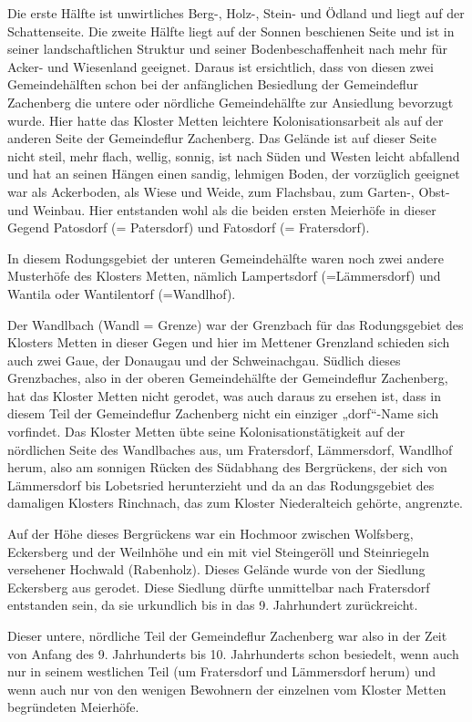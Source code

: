 \documentclass[12pt,a4pager]{book}
\begin{document}
Die erste Hälfte ist unwirtliches Berg-, Holz-, Stein- und Ödland und liegt auf
der Schattenseite. Die zweite Hälfte liegt auf der Sonnen beschienen Seite und
ist in seiner landschaftlichen Struktur und seiner Bodenbeschaffenheit nach mehr
für Acker- und Wiesenland geeignet. Daraus ist ersichtlich, dass von diesen zwei
Gemeindehälften schon bei der anfänglichen Besiedlung der Gemeindeflur
Zachenberg die untere oder nördliche Gemeindehälfte zur Ansiedlung bevorzugt
wurde. Hier hatte das Kloster Metten leichtere Kolonisationsarbeit als auf der
anderen Seite der Gemeindeflur Zachenberg. Das Gelände ist auf dieser Seite
nicht steil, mehr flach, wellig, sonnig, ist nach Süden und Westen leicht
abfallend und hat an seinen Hängen einen sandig, lehmigen Boden, der vorzüglich
geeignet war als Ackerboden, als Wiese und Weide, zum Flachsbau, zum Garten-,
Obst- und Weinbau. Hier entstanden wohl als die beiden ersten Meierhöfe in
dieser Gegend Patosdorf (= Patersdorf) und Fatosdorf (= Fratersdorf).

In diesem Rodungsgebiet der unteren Gemeindehälfte waren noch zwei andere
Musterhöfe des Klosters Metten, nämlich Lampertsdorf (=Lämmersdorf) und Wantila
oder Wantilentorf (=Wandlhof).

Der Wandlbach (Wandl = Grenze) war der Grenzbach für das Rodungsgebiet des
Klosters Metten in dieser Gegen und hier im Mettener Grenzland schieden sich
auch zwei Gaue, der Donaugau und der Schweinachgau. Südlich dieses Grenzbaches,
also in der oberen Gemeindehälfte der Gemeindeflur Zachenberg, hat das Kloster
Metten nicht gerodet, was auch daraus zu ersehen ist, dass in diesem Teil der
Gemeindeflur Zachenberg nicht ein einziger „dorf“-Name sich vorfindet. Das
Kloster Metten übte seine Kolonisationstätigkeit auf der nördlichen Seite des
Wandlbaches aus, um Fratersdorf, Lämmersdorf, Wandlhof herum, also am sonnigen
Rücken des Südabhang des Bergrückens, der sich von Lämmersdorf bis Lobetsried
herunterzieht und da an das Rodungsgebiet des damaligen Klosters Rinchnach, das
zum Kloster Niederalteich gehörte, angrenzte.

Auf der Höhe dieses Bergrückens war ein Hochmoor zwischen Wolfsberg, Eckersberg
und der Weilnhöhe und ein mit viel Steingeröll und Steinriegeln versehener
Hochwald (Rabenholz). Dieses Gelände wurde von der Siedlung Eckersberg aus
gerodet. Diese Siedlung dürfte unmittelbar nach Fratersdorf entstanden sein, da
sie urkundlich bis in das 9. Jahrhundert zurückreicht.

Dieser untere, nördliche Teil der Gemeindeflur Zachenberg war also in der Zeit
von Anfang des 9. Jahrhunderts bis 10. Jahrhunderts schon besiedelt, wenn auch
nur in seinem westlichen Teil (um Fratersdorf und  Lämmersdorf herum) und wenn
auch nur von den wenigen Bewohnern der einzelnen vom Kloster Metten begründeten
Meierhöfe.
\end{document}

